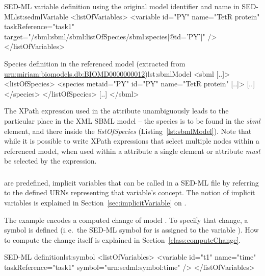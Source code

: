 \begin{myXmlLst}{SED-ML variable definition using the original model identifier and name in SED-ML}{lst:sedmlVariable}
<listOfVariables>
	<variable id="PY" name="TetR protein"  taskReference="task1" 
		target="/sbml:sbml/sbml:listOfSpecies/sbml:species[@id='PY']" />
</listOfVariables>
\end{myXmlLst}

\begin{myXmlLst}{Species definition in the referenced model (extracted from \url{urn:miriam:biomodels.db:BIOMD0000000012})}{lst:sbmlModel}
<sbml [..]>
	<listOfSpecies>
		<species metaid="PY" id="PY" name="TetR protein" [..]>
		[..]
		</species>
 	</listOfSpecies>
 	[..]
</sbml>
\end{myXmlLst}

The XPath expression used in the  attribute unambiguously leads to the particular place in the XML SBML model -- the species is to be found in the \emph{sbml} element, and there inside the \emph{listOfSpecies} (Listing~\vref{lst:sbmlModel}). Note that while it is possible to write XPath expressions that select multiple nodes within a referenced model, when used within a  attribute a single element or attribute \emph{must} be selected by the expression.


\subsubsection{}
\label{sec:symbol}
 are predefined, implicit variables that can be called in a SED-ML file by referring to the defined URNs representing that variable's concept. The notion of implicit variables is explained in Section~\ref{sec:implicitVariable} on .

The example encodes a computed change of model . To specify that change, a symbol is defined (i.\,e.\  the SED-ML symbol for  is assigned to the variable ). How to compute the change itself is explained in Section~\ref{class:computeChange}.

\begin{myXmlLst}{SED-ML  definition}{lst:symbol}
<listOfVariables>
	<variable id="t1" name="time" taskReference="task1" symbol="urn:sedml:symbol:time" />
</listOfVariables>
\end{myXmlLst}


